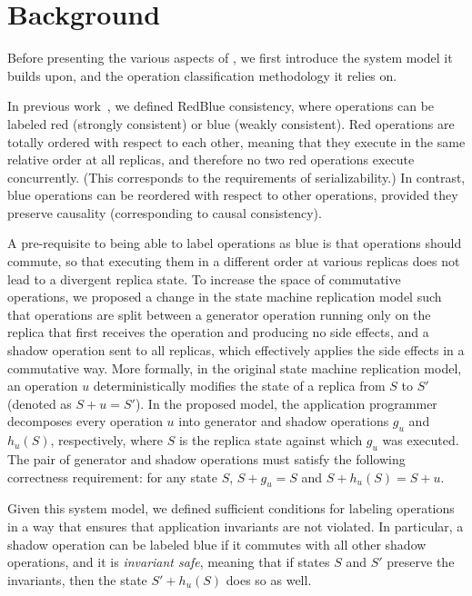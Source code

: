 \section{Background}
\label{ch:sieve:sect:background}

Before presenting the various aspects of \tool, we first
introduce the system model it builds upon, and the operation classification 
methodology it relies on.


In previous work~\cite{Li2012RedBlue}, we defined RedBlue
consistency, where operations can be labeled red (strongly consistent)
or blue (weakly consistent). Red operations are totally ordered with
respect to each other, meaning that they execute in the same relative
order at all replicas, and therefore no two red operations execute
concurrently. (This corresponds to the requirements of serializability.)
 In contrast, blue operations can be reordered with
respect to other operations, provided they preserve causality
(corresponding to causal consistency).

A pre-requisite to being able to label operations as blue is
that operations should commute, so that executing them in a different
order at various replicas does not lead to a divergent replica state.
To increase the space of commutative operations, we proposed a change in the state machine replication model such that
operations are split between a generator operation running only on the
replica that first receives the operation and producing no side
effects, and a shadow operation sent to all replicas, which effectively applies the
side effects in a commutative way. More formally, in the original state
machine replication model, an operation $u$
deterministically modifies the state of a replica from $S$ to $S'$
(denoted as $S+u=S'$). In the proposed model, the application
programmer decomposes every operation $u$ into generator and shadow
operations $g_u$ and $h_u(S)$, respectively, where $S$ is the replica state
against which $g_u$ was executed. The pair of generator and shadow operations
must satisfy the
following correctness requirement: for any state $S$, $S+g_u = S$ and $S+h_u(S) = S+u$.

Given this system model, we defined sufficient
conditions for labeling operations in a way that ensures that
application invariants are not violated.
In particular, a shadow operation can be labeled blue if
it commutes with all other shadow operations, and it is {\em invariant
safe}, 
meaning that if states $S$ and $S'$ preserve the
invariants, then the state $S'+h_u(S)$ does so as well.

